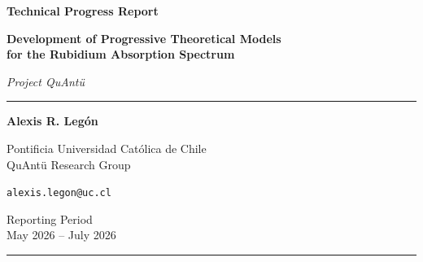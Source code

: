 \documentclass[11pt]{article}
\numberwithin{equation}{section}
\begin{document}


\vspace{0.3cm}

\begin{center}

{\Huge\bfseries\color{mainblue}
Technical Progress Report
}

\vspace{0.4cm}

{\LARGE\bfseries
Development of Progressive Theoretical Models\\
for the Rubidium Absorption Spectrum
}

\vspace{0.3cm}

{\large\itshape
Project QuAntü
}

\vspace{0.45cm}

\hrule

\vspace{0.45cm}

{\Large\bfseries Alexis R. Legón}

\vspace{0.15cm}

Pontificia Universidad Católica de Chile\\
QuAntü Research Group

\vspace{0.15cm}

\texttt{alexis.legon@uc.cl}

\vspace{0.4cm}

Reporting Period\\
{\large May 2026 -- July 2026}

\vspace{0.45cm}

\hrule

\end{center}

\vspace{0.02cm}


\clearpage
\tableofcontents

\newpage
\end{document}
